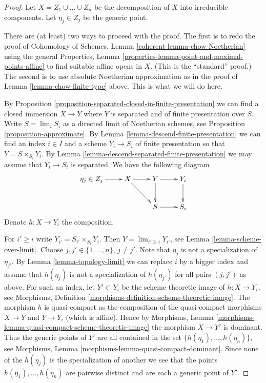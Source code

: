 \documentclass[10pt,a4paper]{amsart}
\theoremstyle{plain}
\theoremstyle{definition}
\theoremstyle{remark}
\numberwithin{equation}{subsection}
\def\lim{\mathop{\mathrm{lim}}\nolimits}
\begin{document}
\begin{proof}
Let $X = Z_1 \cup \ldots \cup Z_n$ be the decomposition of $X$
into irreducible components. Let $\eta_j \in Z_j$ be the generic point.

\medskip\noindent
There are (at least) two ways to proceed with the proof.
The first is to redo the proof of
Cohomology of Schemes, Lemma \ref{coherent-lemma-chow-Noetherian}
using the general
Properties, Lemma \ref{properties-lemma-point-and-maximal-points-affine}
to find suitable affine opens in $X$. (This is the ``standard'' proof.)
The second is to use absolute Noetherian approximation as in
the proof of Lemma \ref{lemma-chow-finite-type} above.
This is what we will do here.

\medskip\noindent
By Proposition \ref{proposition-separated-closed-in-finite-presentation}
we can find a closed immersion $X \to Y$ where $Y$ is separated
and of finite presentation over $S$.
Write $S = \lim_i S_i$ as a directed limit of Noetherian schemes, see
Proposition \ref{proposition-approximate}. By
Lemma \ref{lemma-descend-finite-presentation} we can
find an index $i \in I$ and a scheme $Y_i \to S_i$ of finite presentation
so that $Y = S \times_{S_i} Y_i$.
By Lemma \ref{lemma-descend-separated-finite-presentation}
we may assume that $Y_i \to S_i$ is separated.
We have the following diagram
$$
\xymatrix{
\eta_j \in Z_j \ar[r] & X \ar[r] \ar[rd] & Y \ar[r] \ar[d] & Y_i \ar[d] \\
& & S \ar[r] & S_i
}
$$
Denote $h : X \to Y_i$ the composition.

\medskip\noindent
For $i' \geq i$ write $Y_{i'} = S_{i'} \times_{S_i} Y_i$.
Then $Y = \lim_{i' \geq i} Y_{i'}$, see
Lemma \ref{lemma-scheme-over-limit}.
Choose $j, j' \in \{1, \ldots, n\}$, $j \not = j'$.
Note that $\eta_j$ is not a specialization of $\eta_{j'}$.
By Lemma \ref{lemma-topology-limit}
we can replace $i$ by a bigger index and assume
that $h(\eta_j)$ is not a specialization of $h(\eta_{j'})$
for all pairs $(j, j')$ as above.
For such an index, let
$Y' \subset Y_i$ be the scheme theoretic image of
$h : X \to Y_i$, see
Morphisms, Definition \ref{morphisms-definition-scheme-theoretic-image}.
The morphism $h$ is quasi-compact as the composition of the quasi-compact
morphisms $X \to Y$ and $Y \to Y_i$ (which is affine).
Hence by
Morphisms, Lemma \ref{morphisms-lemma-quasi-compact-scheme-theoretic-image}
the morphism $X \to Y'$ is dominant. Thus the generic points
of $Y'$ are all contained in the set
$\{h(\eta_1), \ldots, h(\eta_n)\}$, see
Morphisms, Lemma \ref{morphisms-lemma-quasi-compact-dominant}.
Since none of the $h(\eta_j)$ is the specialization of another
we see that the points $h(\eta_1), \ldots, h(\eta_n)$ are pairwise
distinct and are each a generic point of $Y'$.


\end{proof}
\end{document}
